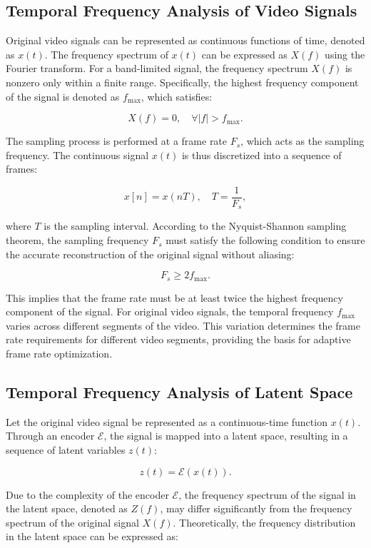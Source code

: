 \subsection{Temporal Frequency Analysis of Video Signals}

Original video signals can be represented as continuous functions of time, denoted as \( x(t) \). The frequency spectrum of \( x(t) \) can be expressed as \( X(f) \) using the Fourier transform. For a band-limited signal, the frequency spectrum \( X(f) \) is nonzero only within a finite range. Specifically, the highest frequency component of the signal is denoted as \( f_{\text{max}} \), which satisfies:

\[
X(f) = 0, \quad \forall |f| > f_{\text{max}}.
\]

The sampling process is performed at a frame rate \( F_s \), which acts as the sampling frequency. The continuous signal \( x(t) \) is thus discretized into a sequence of frames:

\[
x[n] = x(nT), \quad T = \frac{1}{F_s},
\]

where \( T \) is the sampling interval. According to the Nyquist-Shannon sampling theorem, the sampling frequency \( F_s \) must satisfy the following condition to ensure the accurate reconstruction of the original signal without aliasing:

\[
F_s \geq 2 f_{\text{max}}.
\]

This implies that the frame rate must be at least twice the highest frequency component of the signal. For original video signals, the temporal frequency \( f_{\text{max}} \) varies across different segments of the video. This variation determines the frame rate requirements for different video segments, providing the basis for adaptive frame rate optimization.

\subsection{Temporal Frequency Analysis of Latent Space}

Let the original video signal be represented as a continuous-time function \( x(t) \). Through an encoder \( \mathcal{E} \), the signal is mapped into a latent space, resulting in a sequence of latent variables \( z(t) \):

\[
z(t) =\mathcal{E}(x(t)).
\]

Due to the complexity of the encoder \( \mathcal{E} \), the frequency spectrum of the signal in the latent space, denoted as \( Z(f) \), may differ significantly from the frequency spectrum of the original signal \( X(f) \). Theoretically, the frequency distribution in the latent space can be expressed as:

